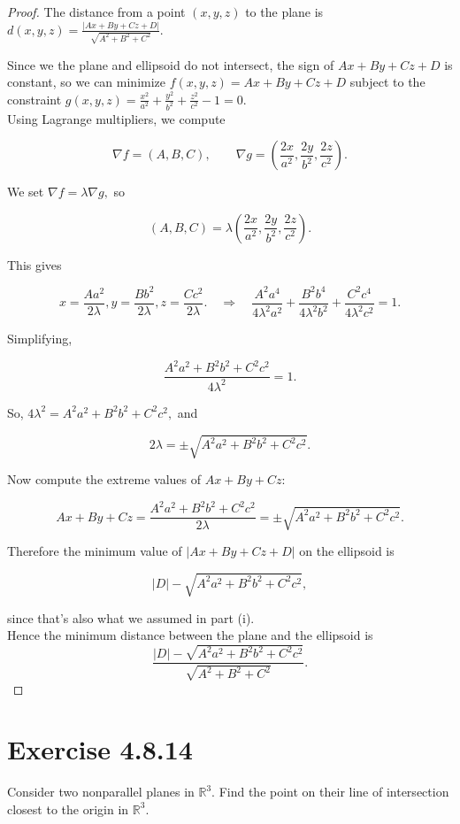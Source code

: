 \documentclass{article}
\begin{document}
\begin{proof}

The distance from a point $(x,y,z)$ to the plane is$
d(x,y,z)=\frac{|Ax+By+Cz+D|}{\sqrt{A^2+B^2+C^2}}.$

Since we the plane and ellipsoid do not intersect, the sign of 
$Ax+By+Cz+D$ is constant, so we can minimize $f(x,y,z)=Ax+By+Cz+D$ subject to the constraint $
g(x,y,z)=\frac{x^2}{a^2}+\frac{y^2}{b^2}+\frac{z^2}{c^2}-1=0.
$ \\

Using Lagrange multipliers, we compute

$$
\nabla f = (A,B,C), \qquad \nabla g = \left(\frac{2x}{a^2},\frac{2y}{b^2},\frac{2z}{c^2}\right).
$$

We set $\nabla f=\lambda \nabla g,$ so

$$
(A,B,C)=\lambda\left(\frac{2x}{a^2},\frac{2y}{b^2},\frac{2z}{c^2}\right).
$$

This gives

$$
x=\frac{A a^2}{2\lambda}, 
y=\frac{B b^2}{2\lambda}, 
z=\frac{C c^2}{2\lambda}. \quad \Rightarrow \quad 
\frac{A^2 a^4}{4\lambda^2 a^2}
+
\frac{B^2 b^4}{4\lambda^2 b^2}
+
\frac{C^2 c^4}{4\lambda^2 c^2}
=1.
$$

Simplifying,

$$
\frac{A^2 a^2 + B^2 b^2 + C^2 c^2}{4\lambda^2}=1.
$$

So, $4\lambda^2=A^2 a^2 + B^2 b^2 + C^2 c^2,$ and

$$
2\lambda=\pm \sqrt{A^2 a^2 + B^2 b^2 + C^2 c^2}.
$$

Now compute the extreme values of $Ax+By+Cz$:

$$
Ax+By+Cz
=
\frac{A^2 a^2 + B^2 b^2 + C^2 c^2}{2\lambda}
=
\pm \sqrt{A^2 a^2 + B^2 b^2 + C^2 c^2}.
$$

Therefore the minimum value of $|Ax+By+Cz+D|$ on the ellipsoid is

$$
|D|-\sqrt{A^2 a^2 + B^2 b^2 + C^2 c^2},
$$

since that's also what we assumed in part (i). \\
Hence the minimum distance between the plane and the ellipsoid is
$$
\frac{|D|-\sqrt{A^2 a^2 + B^2 b^2 + C^2 c^2}}{\sqrt{A^2+B^2+C^2}}.
$$
\end{proof}
\clearpage

\section*{Exercise 4.8.14}
 Consider two nonparallel planes in $\mathbb{R}^3$. Find the point on their line of intersection closest to the origin in $\mathbb{R}^3$.
\end{document}
